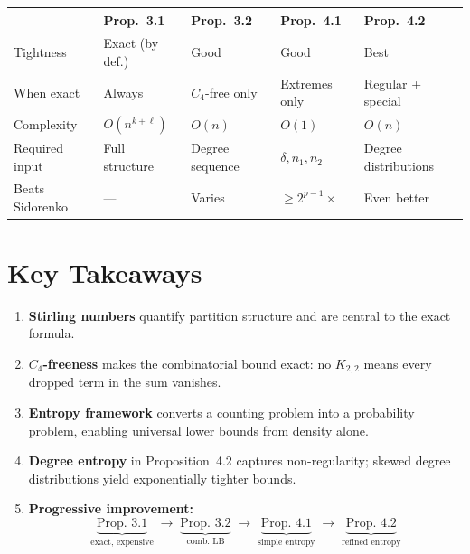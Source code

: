 \documentclass[12pt,a4paper]{article}
\theoremstyle{definition}
\begin{document}
\renewcommand{\arraystretch}{1.4}
\begin{center}
\begin{tabular}{lllll}
  \toprule
  & \textbf{Prop.\ 3.1} & \textbf{Prop.\ 3.2} & \textbf{Prop.\ 4.1} & \textbf{Prop.\ 4.2} \\
  \midrule
  Tightness         & Exact (by def.) & Good            & Good             & Best \\
  When exact        & Always          & $C_4$-free only & Extremes only    & Regular + special \\
  Complexity        & $O(n^{k+\ell})$ & $O(n)$          & $O(1)$           & $O(n)$ \\
  Required input    & Full structure  & Degree sequence & $\delta,n_1,n_2$ & Degree distributions \\
  Beats Sidorenko   & ---             & Varies          & $\geq 2^{p-1}\times$ & Even better \\
  \bottomrule
\end{tabular}
\end{center}

\section{Key Takeaways}

\begin{enumerate}
  \item \textbf{Stirling numbers} quantify partition structure and are central to the exact formula.

  \item \textbf{$C_4$-freeness} makes the combinatorial bound exact: no $K_{2,2}$ means every dropped
    term in the sum vanishes.

  \item \textbf{Entropy framework} converts a counting problem into a probability problem, enabling
    universal lower bounds from density alone.

  \item \textbf{Degree entropy} in Proposition~4.2 captures non-regularity; skewed degree distributions
    yield exponentially tighter bounds.

  \item \textbf{Progressive improvement:}
    \[
      \underbrace{\text{Prop.\ 3.1}}_{\text{exact, expensive}}
      \;\longrightarrow\;
      \underbrace{\text{Prop.\ 3.2}}_{\text{comb.\ LB}}
      \;\longrightarrow\;
      \underbrace{\text{Prop.\ 4.1}}_{\text{simple entropy}}
      \;\longrightarrow\;
      \underbrace{\text{Prop.\ 4.2}}_{\text{refined entropy}}
    \]
\end{enumerate}
\end{document}
